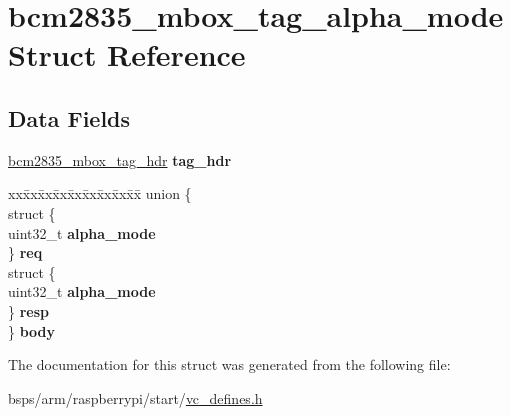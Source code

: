 \hypertarget{structbcm2835__mbox__tag__alpha__mode}{}\section{bcm2835\+\_\+mbox\+\_\+tag\+\_\+alpha\+\_\+mode Struct Reference}
\label{structbcm2835__mbox__tag__alpha__mode}
\subsection*{Data Fields}
\begin{DoxyCompactItemize}
\item 
\mbox{\label{structbcm2835__mbox__tag__alpha__mode_a5461e2c6c65d747f11e504eea745ebe3}} 
\mbox{\hyperlink{structbcm2835__mbox__tag__hdr}{bcm2835\+\_\+mbox\+\_\+tag\+\_\+hdr}} {\bfseries tag\+\_\+hdr}
\item 
\mbox{\label{structbcm2835__mbox__tag__alpha__mode_a8b9c529ca3edcd8032ddeb970f535c56}} 
\begin{tabbing}
xx\=xx\=xx\=xx\=xx\=xx\=xx\=xx\=xx\=\kill
union \{\\
\>struct \{\\
\>\>uint32\_t {\bfseries alpha\_mode}\\
\>\} {\bfseries req}\\
\>struct \{\\
\>\>uint32\_t {\bfseries alpha\_mode}\\
\>\} {\bfseries resp}\\
\} {\bfseries body}\\

\end{tabbing}\end{DoxyCompactItemize}


The documentation for this struct was generated from the following file\+:\begin{DoxyCompactItemize}
\item 
bsps/arm/raspberrypi/start/\mbox{\hyperlink{vc__defines_8h}{vc\+\_\+defines.\+h}}\end{DoxyCompactItemize}
